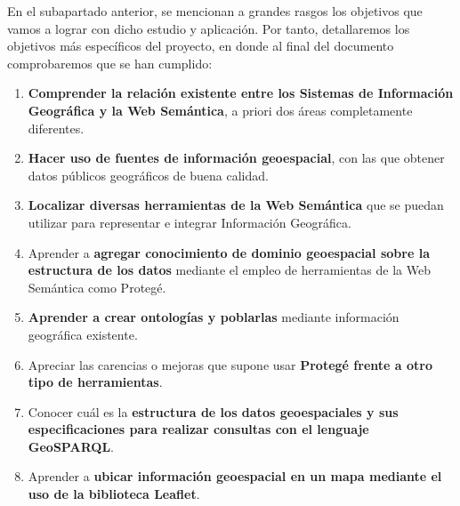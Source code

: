 

En el subapartado anterior, se mencionan a grandes rasgos los objetivos que vamos a lograr con dicho estudio y aplicación. Por tanto, detallaremos los objetivos más específicos del proyecto, en donde al final del documento comprobaremos que se han cumplido:

\begin{enumerate}
	
	\item \textbf{Comprender la relación existente entre los Sistemas de Información Geográfica y la Web Semántica}, a priori dos áreas completamente diferentes.
	
	\item \textbf{Hacer uso de fuentes de información geoespacial}, con las que obtener datos públicos geográficos de buena calidad.
	
	\item \textbf{Localizar diversas herramientas de la Web Semántica} que se puedan utilizar para representar e integrar Información Geográfica.
	
	\item Aprender a \textbf{agregar conocimiento de dominio geoespacial sobre la estructura de los datos} mediante el empleo de herramientas de la Web Semántica como Protegé.
		
	\item \textbf{Aprender a crear ontologías y poblarlas}  mediante información geográfica existente.
	
	\item Apreciar las carencias o mejoras que supone usar \textbf{Protegé frente a otro tipo de herramientas}.
	
	\item Conocer cuál es la \textbf{estructura de los datos geoespaciales y sus especificaciones para realizar consultas con el lenguaje GeoSPARQL}.
	
	\item Aprender a \textbf{ubicar información geoespacial en un mapa mediante el uso de la biblioteca Leaflet}.
	

\end{enumerate}
